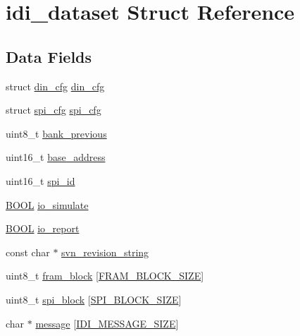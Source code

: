 \hypertarget{structidi__dataset}{\section{idi\+\_\+dataset Struct Reference}
\label{structidi__dataset}
}
\subsection*{Data Fields}
\begin{DoxyCompactItemize}
\item 
struct \hyperlink{structdin__cfg}{din\+\_\+cfg} \hyperlink{structidi__dataset_a295c955273759b0f83aaabe50bd981f0}{din\+\_\+cfg}
\item 
struct \hyperlink{structspi__cfg}{spi\+\_\+cfg} \hyperlink{structidi__dataset_a524ca5c3ea3d76688ccecb7f299f31f4}{spi\+\_\+cfg}
\item 
uint8\+\_\+t \hyperlink{structidi__dataset_aae9e92994011c0d276bdd28589d9aa71}{bank\+\_\+previous}
\item 
uint16\+\_\+t \hyperlink{structidi__dataset_a27de55c6cee77e53ec9631f1f489a97a}{base\+\_\+address}
\item 
uint16\+\_\+t \hyperlink{structidi__dataset_a17f90bb8bd6a75c9d05d2df69b5e6ba3}{spi\+\_\+id}
\item 
\hyperlink{idi_8c_a050c65e107f0c828f856a231f4b4e788}{B\+O\+O\+L} \hyperlink{structidi__dataset_a6513343c81785c28903fc3c4d1d50206}{io\+\_\+simulate}
\item 
\hyperlink{idi_8c_a050c65e107f0c828f856a231f4b4e788}{B\+O\+O\+L} \hyperlink{structidi__dataset_ad5d4eafc81d2a1f443f9a5a09b56efe0}{io\+\_\+report}
\item 
const char $\ast$ \hyperlink{structidi__dataset_a02b7232561c6ed9540ce106d328eedf8}{svn\+\_\+revision\+\_\+string}
\item 
uint8\+\_\+t \hyperlink{structidi__dataset_a4efa21fb4be298d529ae04ed2ca3466e}{fram\+\_\+block} \mbox{[}\hyperlink{idi_8c_a7a7a8212bf3a00a8a97ac4fd9d8b0f29}{F\+R\+A\+M\+\_\+\+B\+L\+O\+C\+K\+\_\+\+S\+I\+Z\+E}\mbox{]}
\item 
uint8\+\_\+t \hyperlink{structidi__dataset_a4370ed563af116d0087bdf1285ef35ea}{spi\+\_\+block} \mbox{[}\hyperlink{idi_8c_a2b82f3c0a4c5c1a46da4c23f43fe1832}{S\+P\+I\+\_\+\+B\+L\+O\+C\+K\+\_\+\+S\+I\+Z\+E}\mbox{]}
\item 
char $\ast$ \hyperlink{structidi__dataset_a90f8e8aa30448abeaead3953145c5ce6}{message} \mbox{[}\hyperlink{idi_8c_a46af412eb7225c2d98d4816555cd3da6}{I\+D\+I\+\_\+\+M\+E\+S\+S\+A\+G\+E\+\_\+\+S\+I\+Z\+E}\mbox{]}
\end{DoxyCompactItemize}


